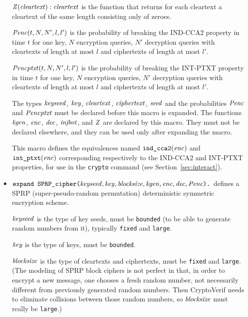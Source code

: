 \documentclass{article}
\begin{document}
\begin{itemize}
   $\mathit{Z}(\mathit{cleartext}): \mathit{cleartext}$ is the function that
  returns for each cleartext a cleartext of the same length consisting
  only of zeroes.

  $\mathit{Penc}(t, N, N', l, l')$ is the probability of breaking the
  IND-CCA2 property in time $t$ for one key, $N$ encryption queries, $N'$
  decryption queries with cleartexts of length at most $l$ and
  ciphertexts of length at most $l'$.

  $\mathit{Pencptxt}(t, N, N', l, l')$ is the probability of breaking the
  INT-PTXT property in time $t$ for one key, $N$ encryption queries, $N'$
  decryption queries with cleartexts of length at most $l$ and
  ciphertexts of length at most $l'$.

   The types $\mathit{keyseed}$, $\mathit{key}$, $\mathit{cleartext}$,
   $\mathit{ciphertext}$, $\mathit{seed}$ and the probabilities $\mathit{Penc}$ and $\mathit{Pencptxt}$ must
   be declared before this macro is expanded. The functions
   $\mathit{kgen}$, $\mathit{enc}$, $\mathit{dec}$, $\mathit{injbot}$, and $\mathit{Z}$ are declared by this
   macro. They must not be declared elsewhere, and they can be used
   only after expanding the macro.

   This macro defines the equivalences named $\texttt{ind\_cca2}(\mathit{enc})$
   and $\texttt{int\_ptxt}(\mathit{enc})$ corresponding respectively to the
   IND-CCA2 and INT-PTXT properties, for use in the \texttt{crypto} command 
   (see Section~\ref{sec:interact}).

\item $\texttt{expand SPRP\_cipher(}\mathit{keyseed}, \mathit{key},
  \mathit{blocksize}, \mathit{kgen}, \mathit{enc}, \mathit{dec}, \mathit{Penc}\texttt{).}$
  defines a SPRP (super-pseudo-random permutation) deterministic
  symmetric encryption scheme.

   $\mathit{keyseed}$ is the type of key seeds, must be \texttt{bounded} (to be able to generate random numbers from it), typically \texttt{fixed} and \texttt{large}.

   $\mathit{key}$ is the type of keys, must be \texttt{bounded}.

   $\mathit{blocksize}$ is the type of cleartexts and ciphertexts, 
   must be \texttt{fixed} and \texttt{large}.
   (The modeling of SPRP block ciphers is not perfect in that, in
   order to encrypt a new message, one chooses a fresh random number,
   not necessarily different from previously generated random
   numbers. Then CryptoVerif needs to eliminate collisions between
   those random numbers, so $\mathit{blocksize}$ must really be
   \texttt{large}.)


\end{itemize}
\end{document}
